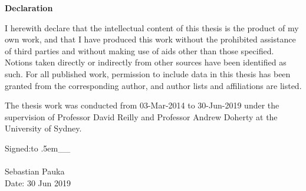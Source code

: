 {}

\bgroup
\LARGE \bf \centering Declaration \\
\egroup

\begin{center}
\begin{minipage}[c]{0.75\textwidth}
\begin{onehalfspace}
    \vspace{2em}
    I herewith declare that the intellectual content of this thesis is the product of my own work, and that I have produced this work without the prohibited assistance of third parties and without making use of aids other than those specified. Notions taken directly or indirectly from other sources have been identified as such. For all published work, permission to include data in this thesis has been granted from the corresponding author, and author lists and affiliations are listed.

    \vspace{1em}
    The thesis work was conducted from 03-Mar-2014 to 30-Jun-2019 under the supervision of Professor David Reilly and Professor Andrew Doherty at the University of Sydney.

    \def\dashsign{\xleaders\hbox to .5em{\_}\hfill\_}
    \vspace{5em}
    \hspace*{0mm}Signed:\vspace{2pt}\dashsign\\
    \vspace{1em} \\
    \hspace*{0mm}\phantom{Signed: }Sebastian Pauka\\
    \hspace*{0mm}\phantom{Signed: }Date: 30 Jun 2019
\end{onehalfspace}
\end{minipage}
\end{center}
